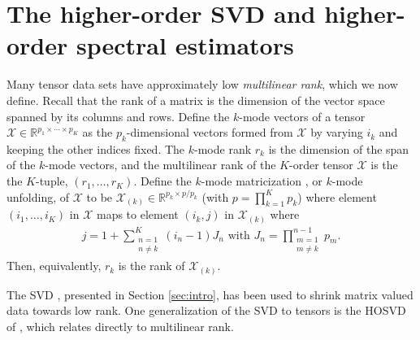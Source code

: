 \section{The higher-order SVD and higher-order spectral estimators}
\label{sec:tensor}

Many tensor data sets have approximately low \emph{multilinear rank},
which we now define. Recall that the rank of a matrix is the dimension
of the vector space spanned by its columns and rows. Define the
$k$-mode vectors of a tensor $\mathcal{X} \in
\mathbb{R}^{p_1\times\cdots\times p_K}$ as the $p_k$-dimensional
vectors formed from $\mathcal{X}$ by varying $i_k$ and keeping the
other indices fixed. The $k$-mode rank $r_k$ is the dimension of the
span of the $k$-mode vectors, and the multilinear rank of the
$K$-order tensor $\mathcal{X}$ is the the $K$-tuple,
$(r_1,\ldots,r_K)$. Define the $k$-mode matricization
\citep{kolda2009tensor}, or $k$-mode unfolding, of $\mathcal{X}$ to be
$\mathcal{X}_{(k)}\in \mathbb{R}^{p_k \times p/p_k}$ (with $p =
\prod_{k=1}^Kp_k$) where element $(i_1,\ldots,i_K)$ in $\mathcal{X}$
maps to element $(i_k,j)$ in $\mathcal{X}_{(k)}$ where
\begin{align*}
  j = 1 + \sum_{\substack{n = 1 \\ n\neq k}}^{K}(i_n - 1)J_n \text{ with } J_n = \prod_{\substack{ m = 1 \\ m \neq k}}^{n-1}p_m.
\end{align*}
Then, equivalently, $r_k$ is the rank of $\mathcal{X}_{(k)}$.

The SVD , presented in Section \ref{sec:intro}, has been used to
shrink matrix valued data towards low rank. One generalization of the
SVD to tensors is the HOSVD of \cite{de2000multilinear}, which relates
directly to multilinear rank.

